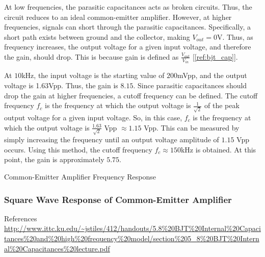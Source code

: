 At low frequencies, the parasitic capacitances acts as broken circuits. Thus, the circuit reduces to an ideal common-emitter amplifier. However, at higher frequencies, signals can short through the parasitic capacitances. Specifically, a short path exists between ground and the collector, making $V_{out} = 0$\si{\volt}. Thus, as frequency increases, the output voltage for a given input voltage, and therefore the gain, should drop. This is because gain is defined as $\frac{V_{out}}{V_{in}}$ [\ref{ref:bjt_cap}].

At $10$\si{\kilo\hertz}, the input voltage is the starting value of $200$\si{\milli\volt}pp, and the output voltage is 1.63\si{\volt}pp. Thus, the gain is $8.15$.
Since parasitic capacitances should drop the gain at higher frequencies, a cutoff frequency can be defined. The cutoff frequency $f_c$ is the frequency at which the output voltage is $\frac{1}{\sqrt{2}}$ of the peak output voltage for a given input voltage. So, in this case, $f_c$ is the frequency at which the output voltage is $\frac{1.63}{\sqrt{2}}$ \si{\volt}pp $ \approx 1.15$ \si{\volt}pp. This can be measured by simply increasing the frequency until an output voltage amplitude of $1.15$ \si{\volt}pp occurs.
Using this method, the cutoff frequency $f_c \approx 150$\si{\kilo\hertz} is obtained.
At this point, the gain is approximately $5.75$.
\FloatBarrier
\begin{table}[h!]
	\centering
	\caption{Common-Emitter Amplifier Frequency Response}
	\label{tab:cea_response}
\end{table}
\FloatBarrier
\subsubsection{Square Wave Response of Common-Emitter Amplifier}

References
\url{http://www.ittc.ku.edu/~jstiles/412/handouts/5.8\%20BJT\%20Internal\%20Capacitances\%20and\%20high\%20frequency\%20model/section\%205_8\%20BJT\%20Internal\%20Capacitances\%20lecture.pdf} %
